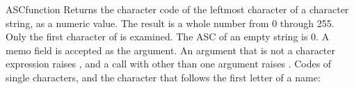 \begin{XbaseEntry}{ASC}{function}
Returns the character code of the leftmost character of a character string, as a numeric value.
\Syntax
{}
\Usage
The result is a whole number from 0 through 255. Only the first character of  is examined. The ASC of an empty string is 0. A memo field is accepted as the argument. An argument that is not a character expression raises , and a call with other than one argument raises .
\Examples
Codes of single characters, and the character that follows the first letter of a name:
\end{XbaseEntry}

